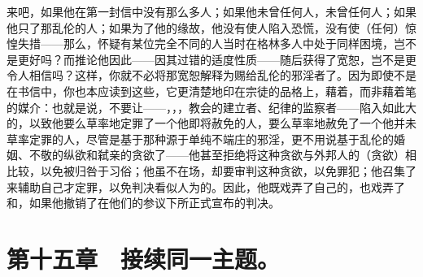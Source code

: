 来吧，如果他在第一封信中没有那么多人；如果他未曾任何人，未曾任何人；如果他只了那乱伦的人；如果为了他的缘故，他没有使人陷入恐慌，没有使（任何）惊惶失措——那么，怀疑有某位完全不同的人当时在格林多人中处于同样困境，岂不是更好吗？而推论他因此——因其过错的适度性质——随后获得了宽恕，岂不是更令人相信吗？这样，你就不必将那宽恕解释为赐给乱伦的邪淫者了。因为即使不是在书信中，你也本应读到这些，它更清楚地印在宗徒的品格上，藉着，而非藉着笔的媒介：也就是说，不要让——，，，教会的建立者、纪律的监察者——陷入如此大的，以致他要么草率地定罪了一个他即将赦免的人，要么草率地赦免了一个他并未草率定罪的人，尽管是基于那种源于单纯不端庄的邪淫，更不用说基于乱伦的婚姻、不敬的纵欲和弑亲的贪欲了——他甚至拒绝将这种贪欲与外邦人的（贪欲）相比较，以免被归咎于习俗；他虽不在场，却要审判这种贪欲，以免罪犯；他召集了来辅助自己才定罪，以免判决看似人为的。因此，他既戏弄了自己的，也戏弄了和，如果他撤销了在他们的参议下所正式宣布的判决。\par


\section{第十五章　接续同一主题。}

